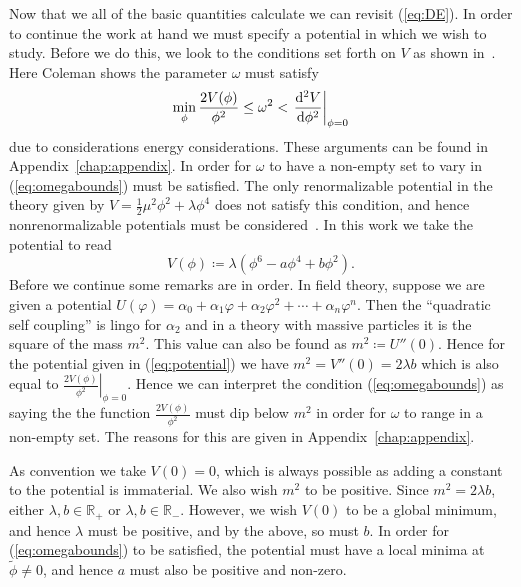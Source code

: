 Now that we all of the basic quantities calculate we can revisit (\ref{eq:DE}).
In order to continue the work at hand we must specify a potential in which we
wish to study. Before we do this, we look to the conditions set forth on \(V\)
as shown in~\cite{coleman}. Here Coleman shows the parameter \(\omega\) must
satisfy
\begin{equation}\label{eq:omegabounds}
    \min_\phi{\frac{2V(\phi)}{\phi^2}}\leq \omega^2 < \left.\dv[2]{V}{\phi}\right|_{\phi = 0}
\end{equation}
due to considerations energy considerations. These arguments can be found in
Appendix~\ref{chap:appendix}. In order for \(\omega\) to have a non-empty set to
vary in (\ref{eq:omegabounds}) must be satisfied. The only renormalizable
potential in the theory given by \(V = \frac{1}{2}\mu^2\phi^2 + \lambda \phi^4\)
does not satisfy this condition, and hence nonrenormalizable potentials must be
considered~\cite{coleman}. In this work we take the potential to read
\begin{equation}\label{eq:potential}
    V(\phi)\coloneqq \lambda\left(\phi^6 - a\phi^4 + b\phi^2\right).
\end{equation}
Before we continue some remarks are in order. In field theory, suppose we are
given a potential \(U(\varphi) = \alpha_0 + \alpha_1\varphi + \alpha_2\varphi^2 + \cdots + \alpha_n\varphi^n\).
Then the ``quadratic self coupling'' is lingo for \(\alpha_2\) and in a theory
with massive particles it is the square of the mass \(m^2\). This value can also
be found as \(m^2\coloneqq U''(0)\). Hence for the potential given in
(\ref{eq:potential}) we have \(m^2 = V''(0) = 2\lambda b\) which is also equal
to \(\left.\frac{2V(\phi)}{\phi^2}\right|_{\phi = 0}\). Hence we can interpret
the condition (\ref{eq:omegabounds}) as saying the the function
\(\frac{2V(\phi)}{\phi^2}\) must dip below \(m^2\) in order for \(\omega\) to
range in a non-empty set. The reasons for this are given in Appendix~\ref{chap:appendix}.

As convention we take \(V(0) = 0\), which is always possible as adding a
constant to the potential is immaterial. We also wish \(m^2\) to be positive.
Since \(m^2 = 2\lambda b\), either \(\lambda,b\in\mathbb{R}_+\) or
\(\lambda,b\in\mathbb{R}_-\). However, we wish \(V(0)\) to be a global minimum,
and hence \(\lambda\) must be positive, and by the above, so must \(b\). In
order for (\ref{eq:omegabounds}) to be satisfied, the potential must have a
local minima at \(\tilde{\phi}\neq 0\), and hence \(a\) must also be positive
and non-zero.

